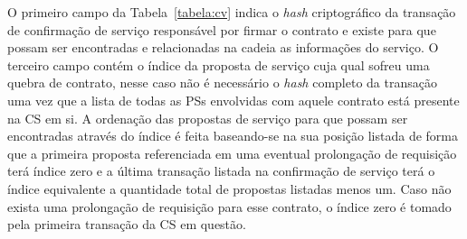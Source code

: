 O primeiro campo da Tabela~\ref{tabela:cv} indica o \textit{hash} criptográfico da transação de confirmação de serviço responsável por firmar o contrato e existe para que possam ser encontradas e relacionadas na cadeia as informações do serviço. O terceiro campo contém o índice da proposta de serviço cuja qual sofreu uma quebra de contrato, nesse caso não é necessário o \textit{hash} completo da transação uma vez que a lista de todas as \acp{PS} envolvidas com aquele contrato está presente na \ac{CS} em si. A ordenação das propostas de serviço para que possam ser encontradas através do índice é feita baseando-se na sua posição listada de forma que a primeira proposta referenciada em uma eventual prolongação de requisição terá índice zero e a última transação listada na confirmação de serviço terá o índice equivalente a quantidade total de propostas listadas menos um. Caso não exista uma prolongação de requisição para esse contrato, o índice zero é tomado pela primeira transação da \ac{CS} em questão. 

%


